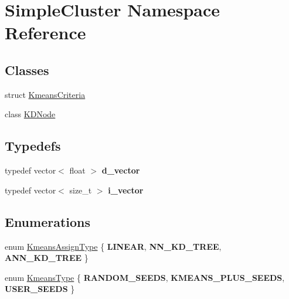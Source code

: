 \hypertarget{namespaceSimpleCluster}{\section{Simple\-Cluster Namespace Reference}
\label{namespaceSimpleCluster}
}
\subsection*{Classes}
\begin{DoxyCompactItemize}
\item 
struct \hyperlink{structSimpleCluster_1_1KmeansCriteria}{Kmeans\-Criteria}
\item 
class \hyperlink{classSimpleCluster_1_1KDNode}{K\-D\-Node}
\end{DoxyCompactItemize}
\subsection*{Typedefs}
\begin{DoxyCompactItemize}
\item 
\hypertarget{namespaceSimpleCluster_a3a66a361cc75ccc7bf0c88528dcaaaac}{typedef vector$<$ float $>$ {\bfseries d\-\_\-vector}}\label{namespaceSimpleCluster_a3a66a361cc75ccc7bf0c88528dcaaaac}

\item 
\hypertarget{namespaceSimpleCluster_a5ed4d3b269ff908803e7b9318179ac30}{typedef vector$<$ size\-\_\-t $>$ {\bfseries i\-\_\-vector}}\label{namespaceSimpleCluster_a5ed4d3b269ff908803e7b9318179ac30}

\end{DoxyCompactItemize}
\subsection*{Enumerations}
\begin{DoxyCompactItemize}
\item 
enum \hyperlink{namespaceSimpleCluster_a1ad2d6129171ff9a5ee57f48b5f3f6e1}{Kmeans\-Assign\-Type} \{ {\bfseries L\-I\-N\-E\-A\-R}, 
{\bfseries N\-N\-\_\-\-K\-D\-\_\-\-T\-R\-E\-E}, 
{\bfseries A\-N\-N\-\_\-\-K\-D\-\_\-\-T\-R\-E\-E}
 \}
\item 
enum \hyperlink{namespaceSimpleCluster_a8a8f57121b69a7b43575e4d6a53928e2}{Kmeans\-Type} \{ {\bfseries R\-A\-N\-D\-O\-M\-\_\-\-S\-E\-E\-D\-S}, 
{\bfseries K\-M\-E\-A\-N\-S\-\_\-\-P\-L\-U\-S\-\_\-\-S\-E\-E\-D\-S}, 
{\bfseries U\-S\-E\-R\-\_\-\-S\-E\-E\-D\-S}
 \}
\end{DoxyCompactItemize}
